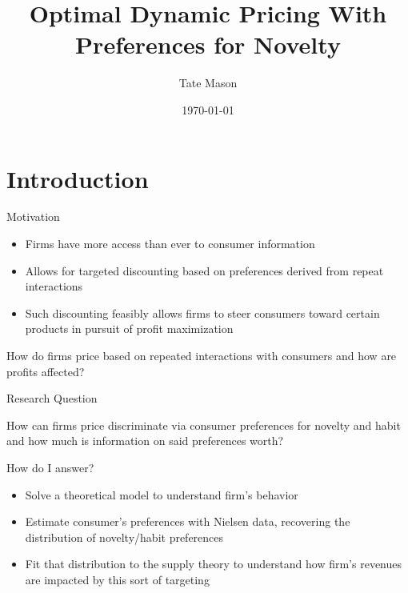 \documentclass[aspectratio=169,professionalfonts]{beamer}
\title{Optimal Dynamic Pricing With Preferences for Novelty}
\subtitle{}
\author{Tate Mason}
\institute{The University of Georgia}
\date{\today}
\begin{document}
\begin{frame}
  \titlepage
\end{frame}

\section{Introduction}
\begin{frame}{Motivation}
  \begin{itemize}
    \item Firms have more access than ever to consumer information 
    \item Allows for targeted discounting based on preferences derived from repeat interactions
    \item Such discounting feasibly allows firms to steer consumers toward certain products in pursuit of profit maximization
  \end{itemize}
  \begin{tcolorbox}
    How do firms price based on repeated interactions with consumers and how are profits affected? 
  \end{tcolorbox}
\end{frame}
\begin{frame}{Research Question}
  \begin{tcolorbox}
    How can firms price discriminate via consumer preferences for novelty and habit and how much is information on said preferences worth?
  \end{tcolorbox}
  How do I answer?
  \begin{itemize}
    \item Solve a theoretical model to understand firm's behavior
    \item Estimate consumer's preferences with Nielsen data, recovering the distribution of novelty/habit preferences
    \item Fit that distribution to the supply theory to understand how firm's revenues are impacted by this sort of targeting
  \end{itemize}
\end{frame}
\end{document}
